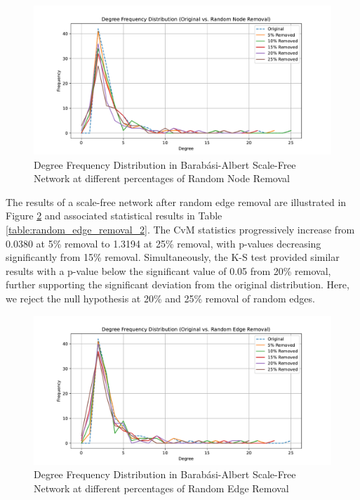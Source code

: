 \documentclass[conference]{IEEEtran} %
\begin{document}
\begin{figure}[t]
  \centering
  \includegraphics[width=1.1\linewidth]{scale_free_network_frequency_distribution_plot_Random Node Removal.pdf}
  \caption{Degree Frequency Distribution in Barabási-Albert Scale-Free Network at different percentages of Random Node Removal}
  \label{fig:14.3}
\end{figure}

The results of a scale-free network after random edge removal are illustrated in Figure \ref{fig:14.4} and associated statistical results in Table \ref{table:random_edge_removal_2}. The CvM statistics progressively increase from 0.0380 at 5\% removal to 1.3194 at 25\% removal, with p-values decreasing significantly from 15\% removal. Simultaneously, the K-S test provided similar results with a p-value below the significant value of 0.05 from 20\% removal, further supporting the significant deviation from the original distribution. Here, we reject the null hypothesis at 20\% and 25\% removal of random edges.

\begin{figure}[t]
  \centering
  \includegraphics[width=1.1\linewidth]{scale_free_network_frequency_distribution_plot_Random Edge Removal.pdf}
  \caption{Degree Frequency Distribution in Barabási-Albert Scale-Free Network at different percentages of Random Edge Removal}
  \label{fig:14.4}
\end{figure}
\end{document}
